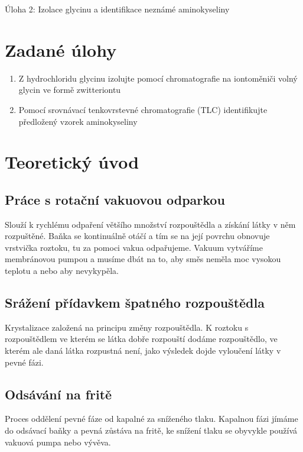 \documentclass[13pt, a4paper, twoside]{article}
\begin{document}
    \begin{center}
        \Huge
        Úloha 2: Izolace glycinu a identifikace neznámé aminokyseliny
    \end{center}
    \large \onehalfspacing
    \section*{Zadané úlohy}
        \begin{enumerate}
            \item Z hydrochloridu glycinu izolujte pomocí chromatografie na iontoměniči
            volný glycin ve formě zwitteriontu
            \item Pomocí srovnávací tenkovrstevné chromatografie (TLC) identifikujte
            předložený vzorek aminokyseliny
        \end{enumerate}
    \section*{Teoretický úvod}
    \subsection*{Práce s rotační vakuovou odparkou}
    Slouží k rychlému odpaření většího množství rozpouštědla a získání látky v něm rozpuštěné.
    Baňka se kontinuálně otáčí a tím se na její povrchu obnovuje vrstvička roztoku, tu za
    pomoci vakua odpařujeme. Vakuum vytváříme membránovou pumpou a musíme dbát na to,
    aby směs neměla moc vysokou teplotu a nebo aby nevykypěla.

    \subsection*{Srážení přídavkem špatného rozpouštědla}
    Krystalizace založená na principu změny rozpouštědla. K roztoku s rozpouštědlem ve
    kterém se látka dobře rozpouští dodáme rozpouštědlo, ve kterém ale daná látka rozpustná
    není, jako výsledek dojde vyloučení látky v pevné fázi.

    \subsection*{Odsávání na fritě}
    Proces oddělení pevné fáze od kapalné za sníženého tlaku. Kapalnou fázi jímáme do
    odsávací baňky a pevná zůstáva na fritě, ke snížení tlaku se obyvykle používá vakuová
    pumpa nebo vývěva. 
    
\end{document}
